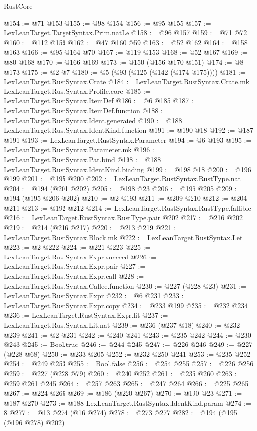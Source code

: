 \begin{lexlean}{RustCore}
\begin{coremodule}
@154 := @71 @153
@155 := @98 @154
@156 := @95 @155
@157 := LexLeanTarget.TargetSyntax.Prim.natLe
@158 := @96 @157
@159 := @71 @72
@160 := @112 @159
@162 := @47 @160 @59
@163 := @52 @162
@164 := @158 @163
@166 := @95 @164 @70
@167 := @119 @153
@168 := @52 @167
@169 := @80 @168
@170 := @166 @169
@173 := @150 (@156 @170 @151)
@174 := @8 @173
@175 := @2 @7
@180 := @5 (@93 (@125 (@142 (@174 @175))))
@181 := LexLeanTarget.RustSyntax.Crate
@184 := LexLeanTarget.RustSyntax.Crate.mk LexLeanTarget.RustSyntax.Profile.core
@185 := LexLeanTarget.RustSyntax.ItemDef
@186 := @6 @185
@187 := LexLeanTarget.RustSyntax.ItemDef.function
@188 := LexLeanTarget.RustSyntax.Ident.generated
@190 := @188 LexLeanTarget.RustSyntax.IdentKind.function
@191 := @190 @18
@192 := @187 @191
@193 := LexLeanTarget.RustSyntax.Parameter
@194 := @6 @193
@195 := LexLeanTarget.RustSyntax.Parameter.mk
@196 := LexLeanTarget.RustSyntax.Pat.bind
@198 := @188 LexLeanTarget.RustSyntax.IdentKind.binding
@199 := @198 @18
@200 := @196 @199
@201 := @195 @200
@202 := LexLeanTarget.RustSyntax.RustType.nat
@204 := @194 (@201 @202)
@205 := @198 @23
@206 := @196 @205
@209 := @194 (@195 @206 @202)
@210 := @2 @193
@211 := @209 @210
@212 := @204 @211
@213 := @192 @212
@214 := LexLeanTarget.RustSyntax.RustType.fallible
@216 := LexLeanTarget.RustSyntax.RustType.pair @202
@217 := @216 @202
@219 := @214 (@216 @217)
@220 := @213 @219
@221 := LexLeanTarget.RustSyntax.Block.mk
@222 := LexLeanTarget.RustSyntax.Let
@223 := @2 @222
@224 := @221 @223
@225 := LexLeanTarget.RustSyntax.Expr.succeed
@226 := LexLeanTarget.RustSyntax.Expr.pair
@227 := LexLeanTarget.RustSyntax.Expr.call
@228 := LexLeanTarget.RustSyntax.Callee.function
@230 := @227 (@228 @23)
@231 := LexLeanTarget.RustSyntax.Expr
@232 := @6 @231
@233 := LexLeanTarget.RustSyntax.Expr.copy
@234 := @233 @199
@235 := @232 @234
@236 := LexLeanTarget.RustSyntax.Expr.lit
@237 := LexLeanTarget.RustSyntax.Lit.nat
@239 := @236 (@237 @18)
@240 := @232 @239
@241 := @2 @231
@242 := @240 @241
@243 := @235 @242
@244 := @230 @243
@245 := Bool.true
@246 := @244 @245
@247 := @226 @246
@249 := @227 (@228 @68)
@250 := @233 @205
@252 := @232 @250 @241
@253 := @235 @252
@254 := @249 @253
@255 := Bool.false
@256 := @254 @255
@257 := @226 @256
@259 := @227 (@228 @79)
@260 := @240 @252
@261 := @235 @260
@263 := @259 @261 @245
@264 := @257 @263
@265 := @247 @264
@266 := @225 @265
@267 := @224 @266
@269 := @186 (@220 @267)
@270 := @190 @23
@271 := @187 @270
@273 := @188 LexLeanTarget.RustSyntax.IdentKind.param
@274 := 8
@277 := @13 @274 (@16 @274)
@278 := @273 @277
@282 := @194 (@195 (@196 @278) @202)

\end{coremodule}
\end{lexlean}
